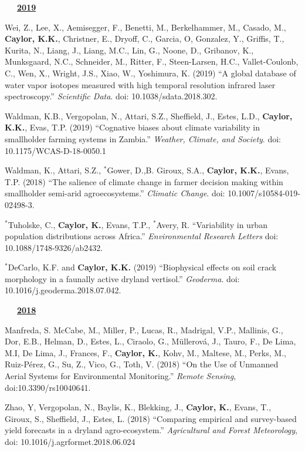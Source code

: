 \documentclass[10pt]{report}
\begin{document}
\begin{etaremune}
\mbox{\ \ \ \underline{\textbf{2019}}}

\item Wei, Z., Lee, X., Aemisegger, F., Benetti, M., Berkelhammer, M., Casado, M., \textbf{Caylor, K.K.}, Christner, E., Dryoff, C., Garcia, O, Gonzalez, Y., Griffis, T., Kurita, N., Liang, J., Liang, M.C., Lin, G., Noone, D., Gribanov, K., Munksgaard, N.C., Schneider, M., Ritter, F., Steen-Larsen, H.C., Vallet-Coulonb, C., Wen, X., Wright, J.S., Xiao, W., Yoshimura, K. (2019) ``A global database of water vapor isotopes measured with high temporal resolution infrared laser spectroscopy.'' {\em Scientific Data}. doi: 10.1038/sdata.2018.302.

\item Waldman, K.B., Vergopolan, N., Attari, S.Z., Sheffield, J., Estes, L.D., \textbf{Caylor, K.K.}, Evas, T.P. (2019) ``Cognative biases about climate variability in smallholder farming systems in Zambia.'' {\em Weather, Climate, and Society}. doi: 10.1175/WCAS-D-18-0050.1

\item Waldman, K., Attari, S.Z., \small $^{*}$Gower, D.,B. Giroux, S.A., \textbf{Caylor, K.K.}, Evans, T.P. (2018) ``The salience of climate change in farmer decision making within smallholder semi-arid agroecosystems.'' {\em Climatic Change}. doi: 10.1007/s10584-019-02498-3.

\item $^{*}$Tuholske, C., \textbf{Caylor, K.}, Evans, T.P., $^{*}$Avery, R. ``Variability in urban population distributions across Africa.'' {\em Environmental Research Letters} doi: 10.1088/1748-9326/ab2432.

\item $^{*}$DeCarlo, K.F. and \textbf{Caylor, K.K.} (2019) ``Biophysical effects on soil crack morphology in a faunally active dryland vertisol.'' {\em Geoderma}. doi: 10.1016/j.geoderma.2018.07.042.

\mbox{\ \ \ \underline{\textbf{2018}}}

\item Manfreda, S. McCabe, M., Miller, P., Lucas, R.,  Madrigal, V.P., Mallinis, G., Dor, E.B., Helman, D., Estes, L., Ciraolo, G., Müllerová, J., Tauro, F., De Lima, M.I, De Lima, J., Frances, F., \textbf{Caylor, K.}, Kohv, M., Maltese, M., Perks, M., Ruiz-Pérez, G., Su, Z., Vico, G., Toth, V. (2018) ``On the Use of Unmanned Aerial Systems for Environmental Monitoring.'' {\em Remote Sensing}, doi:10.3390/rs10040641.


\item Zhao, Y, Vergopolan, N., Baylis, K., Blekking, J.,  \textbf{Caylor, K.}, Evans, T., Giroux, S., Sheffield, J., Estes, L. (2018) ``Comparing empirical and survey-based yield forecasts in a dryland agro-ecosystem.'' {\em Agricultural and Forest Meteorology}, doi: 10.1016/j.agrformet.2018.06.024
 

\end{etaremune}
\end{document}
